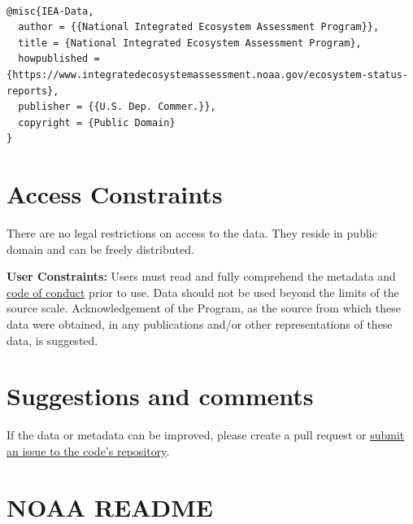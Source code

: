 \documentclass[
  letterpaper,
  oneside,
  open=any]{scrbook}
\begin{document}
\begin{verbatim}

@misc{IEA-Data,
  author = {{National Integrated Ecosystem Assessment Program}},
  title = {National Integrated Ecosystem Assessment Program},
  howpublished = {https://www.integratedecosystemassessment.noaa.gov/ecosystem-status-reports},
  publisher = {{U.S. Dep. Commer.}},
  copyright = {Public Domain} 
}
\end{verbatim}

\hypertarget{access-constraints}{%
\section*{Access Constraints}\label{access-constraints}}


There are no legal restrictions on access to the data. They reside in
public domain and can be freely distributed.

\textbf{User Constraints:} Users must read and fully comprehend the
metadata and
\href{https://IEA-Data.io/IEA_Data_Guidance_Doc/content/code-of-conduct.html}{code
of conduct} prior to use. Data should not be used beyond the limits of
the source scale. Acknowledgement of the Program, as the source from
which these data were obtained, in any publications and/or other
representations of these data, is suggested.

\hypertarget{suggestions-and-comments}{%
\section*{Suggestions and comments}\label{suggestions-and-comments}}


If the data or metadata can be improved, please create a pull request or
\href{https://github.com/IEA-Data/IEA_Data_Guidance_Doc//issues}{submit
an issue to the code's repository}.

\hypertarget{noaa-readme}{%
\section*{NOAA README}\label{noaa-readme}}

\end{document}
